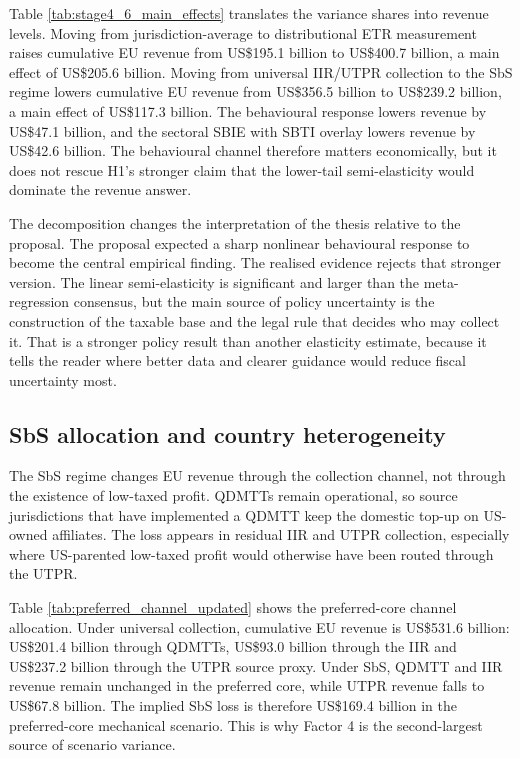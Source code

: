 \documentclass[11pt,a4paper]{article}
\begin{document}


Table \ref{tab:stage4_6_main_effects} translates the variance shares into revenue levels. Moving from jurisdiction-average to distributional ETR measurement raises cumulative EU revenue from US\$195.1 billion to US\$400.7 billion, a main effect of US\$205.6 billion. Moving from universal IIR/UTPR collection to the SbS regime lowers cumulative EU revenue from US\$356.5 billion to US\$239.2 billion, a main effect of US\$117.3 billion. The behavioural response lowers revenue by US\$47.1 billion, and the sectoral SBIE with SBTI overlay lowers revenue by US\$42.6 billion. The behavioural channel therefore matters economically, but it does not rescue H1's stronger claim that the lower-tail semi-elasticity would dominate the revenue answer.

The decomposition changes the interpretation of the thesis relative to the proposal. The proposal expected a sharp nonlinear behavioural response to become the central empirical finding. The realised evidence rejects that stronger version. The linear semi-elasticity is significant and larger than the meta-regression consensus, but the main source of policy uncertainty is the construction of the taxable base and the legal rule that decides who may collect it. That is a stronger policy result than another elasticity estimate, because it tells the reader where better data and clearer guidance would reduce fiscal uncertainty most.


\subsection{SbS allocation and country heterogeneity}\label{sec:results_sbs}

The SbS regime changes EU revenue through the collection channel, not through the existence of low-taxed profit. QDMTTs remain operational, so source jurisdictions that have implemented a QDMTT keep the domestic top-up on US-owned affiliates. The loss appears in residual IIR and UTPR collection, especially where US-parented low-taxed profit would otherwise have been routed through the UTPR.



Table \ref{tab:preferred_channel_updated} shows the preferred-core channel allocation. Under universal collection, cumulative EU revenue is US\$531.6 billion: US\$201.4 billion through QDMTTs, US\$93.0 billion through the IIR and US\$237.2 billion through the UTPR source proxy. Under SbS, QDMTT and IIR revenue remain unchanged in the preferred core, while UTPR revenue falls to US\$67.8 billion. The implied SbS loss is therefore US\$169.4 billion in the preferred-core mechanical scenario. This is why Factor 4 is the second-largest source of scenario variance.
\end{document}
